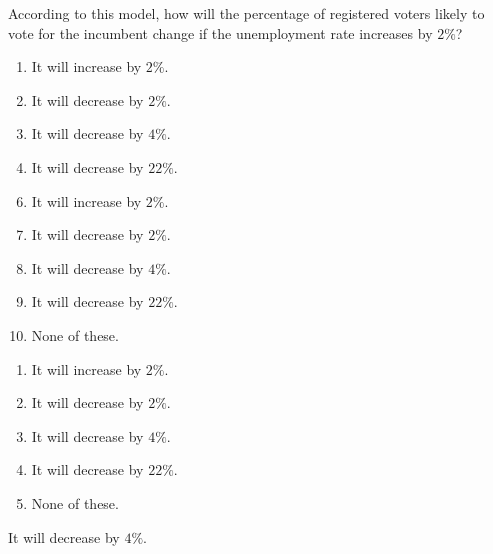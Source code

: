  
According to this model, how will the percentage of registered voters likely to vote for the incumbent change if the unemployment rate increases by $2\%$?


\ifsat
	\begin{enumerate}[label=\Alph*)]
		\item It will increase by $2\%$.
		\item It will decrease by $2\%$.
		\item It will decrease by $4\%$. %
		\item It will decrease by $22\%$.
	\end{enumerate}
\else
\fi

\ifacteven
	\begin{enumerate}[label=\textbf{\Alph*.},itemsep=\fill,align=left]
		\setcounter{enumii}{5}
		\item It will increase by $2\%$.
		\item It will decrease by $2\%$.
		\item It will decrease by $4\%$. %
		\addtocounter{enumii}{1}
		\item It will decrease by $22\%$.
		\item None of these. 
	\end{enumerate}
\else
\fi

\ifactodd
	\begin{enumerate}[label=\textbf{\Alph*.},itemsep=\fill,align=left]
		\item It will increase by $2\%$.
		\item It will decrease by $2\%$.
		\item It will decrease by $4\%$. %
		\item It will decrease by $22\%$.
		\item None of these. 
	\end{enumerate}
\else
\fi

\ifgridin
 It will decrease by $4\%$. %
		
\else
\fi

